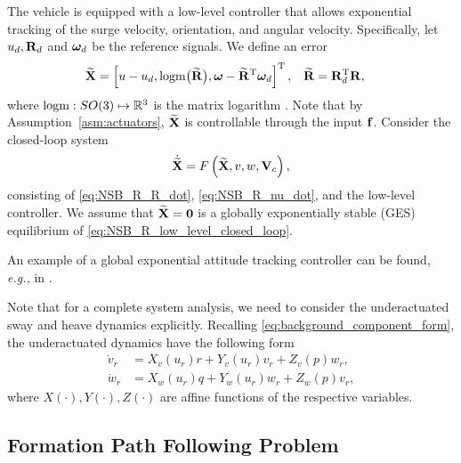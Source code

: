 \begin{asm}
    \label{ass5}
    The vehicle is equipped with a low-level controller that allows exponential tracking of the surge velocity, orientation, and angular velocity.
    Specifically, let $u_d, \mathbf{R}_d$ and $\bm{\omega}_d$ be the reference signals.
    We define an error 
    \begin{align}
        \widetilde{\mathbf{X}} &= \left[u - u_d, {\rm logm}\bigl(\widetilde{\mathbf{R}}\bigr), \bm{\omega} - \widetilde{\mathbf{R}}^{\mathrm{T}}\bm{\omega}_d\right]^{\mathrm{T}}, &
        \widetilde{\mathbf{R}} &= \mathbf{R}_d^{\mathrm{T}}\mathbf{R}, \label{eq:NSB_R_low_level_error}
    \end{align}
    where ${\rm logm} : SO(3) \mapsto \mathbb{R}^3$ is the matrix logarithm \cite{iserles_lie_2000}.
    Note that by Assumption~\ref{asm:actuators}, $\widetilde{\mathbf{X}}$ is controllable through the input $\mathbf{f}$.
    Consider the closed-loop system 
    \begin{equation}
        \dot{\widetilde{\mathbf{X}}} = F \left( \widetilde{\mathbf{X}}, v, w, \mathbf{V}_c \right), \label{eq:NSB_R_low_level_closed_loop}
    \end{equation}
    consisting of \eqref{eq:NSB_R_R_dot}, \eqref{eq:NSB_R_nu_dot}, and the low-level controller.
    We assume that $\widetilde{\mathbf{X}} = \mathbf{0}$ is a globally exponentially stable (GES) equilibrium of \eqref{eq:NSB_R_low_level_closed_loop}.
\end{asm}

An example of a global exponential attitude tracking controller can be found, \emph{e.g.,} in \cite{lee_global_2015}.

Note that for a complete system analysis, we need to consider the underactuated sway and heave dynamics explicitly. 
Recalling \eqref{eq:background_component_form}, the underactuated dynamics have the following form 
\begin{subequations}
    \begin{align}
        \dot{v}_r &= X_v(u_r)r + Y_v(u_r)v_r + Z_v(p)w_r, \\
        \dot{w}_r &= X_w(u_r)q + Y_w(u_r)w_r + Z_w(p)v_r,
        \label{eq:NSB_R_underactuated_dynamics}
    \end{align}
\end{subequations}
where $X(\cdot), Y(\cdot), Z(\cdot)$ are affine functions of the respective variables.

\subsection{Formation Path Following Problem}
\label{sec:NSB_R_objectives}

